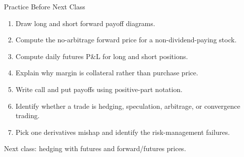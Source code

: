 \documentclass[aspectratio=169,11pt]{beamer}
\begin{document}
\begin{frame}{Practice Before Next Class}
    \begin{enumerate}
        \item Draw long and short forward payoff diagrams.
        \item Compute the no-arbitrage forward price for a non-dividend-paying stock.
        \item Compute daily futures P\&L for long and short positions.
        \item Explain why margin is collateral rather than purchase price.
        \item Write call and put payoffs using positive-part notation.
        \item Identify whether a trade is hedging, speculation, arbitrage, or convergence trading.
        \item Pick one derivatives mishap and identify the risk-management failures.
    \end{enumerate}
\end{frame}

\begin{frame}
    \centering
    \Large Next class: hedging with futures and forward/futures prices.
\end{frame}
\end{document}
